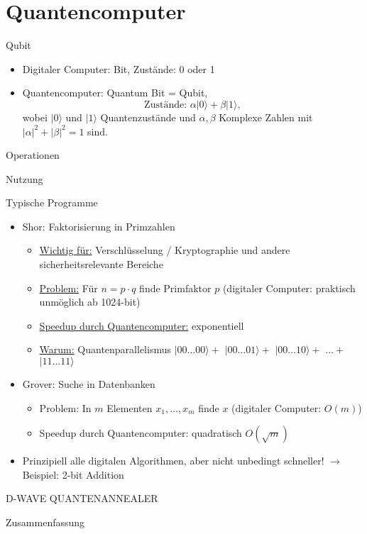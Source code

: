 \section{Quantencomputer}

\begin{defi}[Quantencomputer]{Qubit}
    \begin{itemize}
        \item Digitaler Computer: Bit, Zustände: 0 oder 1
        \item Quantencomputer: Quantum Bit = Qubit,
              $$\text{Zustände: } \alpha|0\rangle + \beta|1\rangle,$$
              wobei $|0\rangle$ und $|1\rangle$ Quantenzustände und
              $\alpha, \beta$ Komplexe Zahlen mit $|\alpha|^2 + |\beta|^2 = 1$ sind.
    \end{itemize}
\end{defi}

\begin{defi}[Quantencomputer]{Operationen}

\end{defi}

\begin{defi}[Quantencomputer]{Nutzung}

\end{defi}

\begin{defi}[Quantencomputer]{Typische Programme}
    \begin{itemize}
        \item Shor: Faktorisierung in Primzahlen
              \begin{itemize}
                  \item \underline{Wichtig für:} Verschlüsselung / Kryptographie und andere sicherheitsrelevante Bereiche
                  \item \underline{Problem:} Für $n=p\cdot q$ finde Primfaktor $p$
                        (digitaler Computer: praktisch unmöglich ab 1024-bit)
                  \item \underline{Speedup durch Quantencomputer:} exponentiell
                  \item \underline{Warum:} Quantenparallelismus $|00\ldots00\rangle+$ $|00\ldots01\rangle+$ $|00\ldots10\rangle+$ $\ldots+$ $|11\ldots11\rangle$
              \end{itemize}
        \item Grover: Suche in Datenbanken
              \begin{itemize}
                  \item Problem: In $m$ Elementen $x_1, \ldots, x_m$ finde $x$ (digitaler Computer: $O(m)$)
                  \item Speedup durch Quantencomputer: quadratisch $O(\sqrt{m})$
              \end{itemize}
        \item Prinzipiell alle digitalen Algorithmen, aber nicht unbedingt schneller! $\to$ Beispiel: 2-bit Addition
    \end{itemize}
\end{defi}

\begin{defi}[Quantencomputer]{D-WAVE QUANTENANNEALER}

\end{defi}

\begin{bonus}[Quantencomputer]{Zusammenfassung}

\end{bonus}